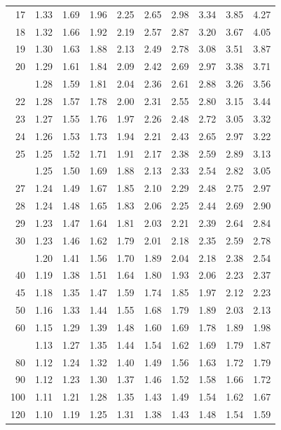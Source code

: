 \documentclass[10pt]{article}
\begin{document}
\begin{longtable}{@{}r!{\vrule width 0.8pt\hspace{0.55em}}rrrrrrrrr@{}}
17 & 1.33 & 1.69 & 1.96 & 2.25 & 2.65 & 2.98 & 3.34 & 3.85 & 4.27 \\
18 & 1.32 & 1.66 & 1.92 & 2.19 & 2.57 & 2.87 & 3.20 & 3.67 & 4.05 \\
19 & 1.30 & 1.63 & 1.88 & 2.13 & 2.49 & 2.78 & 3.08 & 3.51 & 3.87 \\
20 & 1.29 & 1.61 & 1.84 & 2.09 & 2.42 & 2.69 & 2.97 & 3.38 & 3.71 \\
 & 1.28 & 1.59 & 1.81 & 2.04 & 2.36 & 2.61 & 2.88 & 3.26 & 3.56 \\
22 & 1.28 & 1.57 & 1.78 & 2.00 & 2.31 & 2.55 & 2.80 & 3.15 & 3.44 \\
23 & 1.27 & 1.55 & 1.76 & 1.97 & 2.26 & 2.48 & 2.72 & 3.05 & 3.32 \\
24 & 1.26 & 1.53 & 1.73 & 1.94 & 2.21 & 2.43 & 2.65 & 2.97 & 3.22 \\
25 & 1.25 & 1.52 & 1.71 & 1.91 & 2.17 & 2.38 & 2.59 & 2.89 & 3.13 \\
 & 1.25 & 1.50 & 1.69 & 1.88 & 2.13 & 2.33 & 2.54 & 2.82 & 3.05 \\
27 & 1.24 & 1.49 & 1.67 & 1.85 & 2.10 & 2.29 & 2.48 & 2.75 & 2.97 \\
28 & 1.24 & 1.48 & 1.65 & 1.83 & 2.06 & 2.25 & 2.44 & 2.69 & 2.90 \\
29 & 1.23 & 1.47 & 1.64 & 1.81 & 2.03 & 2.21 & 2.39 & 2.64 & 2.84 \\
30 & 1.23 & 1.46 & 1.62 & 1.79 & 2.01 & 2.18 & 2.35 & 2.59 & 2.78 \\
 & 1.20 & 1.41 & 1.56 & 1.70 & 1.89 & 2.04 & 2.18 & 2.38 & 2.54 \\
40 & 1.19 & 1.38 & 1.51 & 1.64 & 1.80 & 1.93 & 2.06 & 2.23 & 2.37 \\
45 & 1.18 & 1.35 & 1.47 & 1.59 & 1.74 & 1.85 & 1.97 & 2.12 & 2.23 \\
50 & 1.16 & 1.33 & 1.44 & 1.55 & 1.68 & 1.79 & 1.89 & 2.03 & 2.13 \\
60 & 1.15 & 1.29 & 1.39 & 1.48 & 1.60 & 1.69 & 1.78 & 1.89 & 1.98 \\
 & 1.13 & 1.27 & 1.35 & 1.44 & 1.54 & 1.62 & 1.69 & 1.79 & 1.87 \\
80 & 1.12 & 1.24 & 1.32 & 1.40 & 1.49 & 1.56 & 1.63 & 1.72 & 1.79 \\
90 & 1.12 & 1.23 & 1.30 & 1.37 & 1.46 & 1.52 & 1.58 & 1.66 & 1.72 \\
100 & 1.11 & 1.21 & 1.28 & 1.35 & 1.43 & 1.49 & 1.54 & 1.62 & 1.67 \\
120 & 1.10 & 1.19 & 1.25 & 1.31 & 1.38 & 1.43 & 1.48 & 1.54 & 1.59 \\

\end{longtable}
\end{document}
